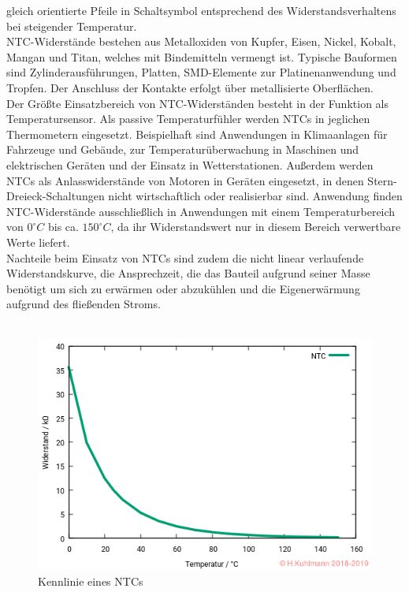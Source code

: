 gleich orientierte Pfeile in Schaltsymbol entsprechend des Widerstandsverhaltens bei steigender
Temperatur.\\
NTC-Widerstände bestehen aus Metalloxiden von Kupfer, Eisen, Nickel, Kobalt, Mangan und Titan,
welches mit Bindemitteln vermengt ist. Typische Bauformen sind Zylinderausführungen, Platten,
SMD-Elemente zur Platinenanwendung und Tropfen. Der Anschluss der Kontakte erfolgt über
metallisierte Oberflächen.\\
Der Größte Einsatzbereich von NTC-Widerständen besteht in der Funktion als Temperatursensor. Als
passive Temperaturfühler werden NTCs in jeglichen Thermometern eingesetzt. Beispielhaft sind
Anwendungen in Klimaanlagen für Fahrzeuge und Gebäude, zur Temperaturüberwachung in
Maschinen und elektrischen Geräten und der Einsatz in Wetterstationen. Außerdem werden NTCs als
Anlasswiderstände von Motoren in Geräten eingesetzt, in denen Stern-Dreieck-Schaltungen nicht
wirtschaftlich oder realisierbar sind. Anwendung finden NTC-Widerstände ausschließlich in
Anwendungen mit einem Temperaturbereich von $0^{\circ} C$ bis ca. $150^{\circ} C$, da ihr Widerstandswert nur in
diesem Bereich verwertbare Werte liefert.\\
Nachteile beim Einsatz von NTCs sind zudem die nicht linear verlaufende Widerstandskurve, die
Ansprechzeit, die das Bauteil aufgrund seiner Masse benötigt um sich zu erwärmen oder abzukühlen
und die Eigenerwärmung aufgrund des fließenden Stroms.\cite{formelsammlung} \cite{halbleiter}\\
\\
\begin{figure}[htb]
    \includegraphics[width=13cm]{./res/NTC_Kennlinie}
    \caption{Kennlinie eines NTCs}
    \label{fig:NTCKenn}
\end{figure}

